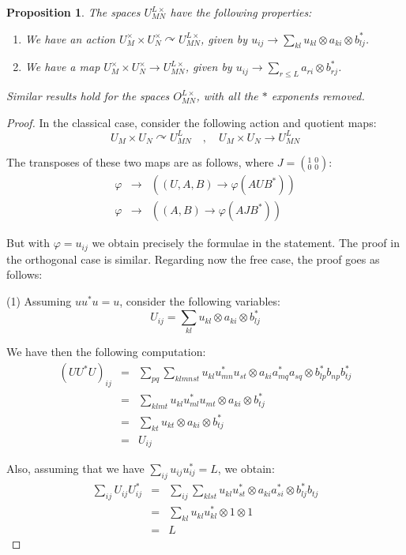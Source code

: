 \documentclass[12pt]{amsbook}
\newtheorem{proposition}[theorem]{Proposition}
\begin{document}
\begin{proposition}
The spaces $U_{MN}^{L\times}$ have the following properties:
\begin{enumerate}
\item We have an action $U_M^\times\times U_N^\times\curvearrowright U_{MN}^{L\times}$, given by $u_{ij}\to\sum_{kl}u_{kl}\otimes a_{ki}\otimes b_{lj}^*$.

\item We have a map $U_M^\times\times U_N^\times\to U_{MN}^{L\times}$, given by $u_{ij}\to\sum_{r\leq L}a_{ri}\otimes b_{rj}^*$.
\end{enumerate}
Similar results hold for the spaces $O_{MN}^{L\times}$, with all the $*$ exponents removed.
\end{proposition}

\begin{proof}
In the classical case, consider the following action and quotient maps:
$$U_M\times U_N\curvearrowright U_{MN}^L\quad,\quad 
U_M\times U_N\to U_{MN}^L$$

The transposes of these two maps are as follows, where $J=(^1_0{\ }^0_0)$:
\begin{eqnarray*}
\varphi&\to&((U,A,B)\to\varphi(AUB^*))\\
\varphi&\to&((A,B)\to\varphi(AJB^*))
\end{eqnarray*}

But with $\varphi=u_{ij}$ we obtain precisely the formulae in the statement. The proof in the orthogonal case is similar. Regarding now the free case, the proof goes as follows:

\medskip

(1) Assuming $uu^*u=u$, consider the following variables:
$$U_{ij}=\sum_{kl}u_{kl}\otimes a_{ki}\otimes b_{lj}^*$$

We have then the following computation:
\begin{eqnarray*}
(UU^*U)_{ij}
&=&\sum_{pq}\sum_{klmnst}u_{kl}u_{mn}^*u_{st}\otimes a_{ki}a_{mq}^*a_{sq}\otimes b_{lp}^*b_{np}b_{tj}^*\\
&=&\sum_{klmt}u_{kl}u_{ml}^*u_{mt}\otimes a_{ki}\otimes b_{tj}^*\\
&=&\sum_{kt}u_{kt}\otimes a_{ki}\otimes b_{tj}^*\\
&=&U_{ij}
\end{eqnarray*}

Also, assuming that we have $\sum_{ij}u_{ij}u_{ij}^*=L$, we obtain:
\begin{eqnarray*}
\sum_{ij}U_{ij}U_{ij}^*
&=&\sum_{ij}\sum_{klst}u_{kl}u_{st}^*\otimes a_{ki}a_{si}^*\otimes b_{lj}^*b_{tj}\\
&=&\sum_{kl}u_{kl}u_{kl}^*\otimes1\otimes1\\
&=&L
\end{eqnarray*}


\end{proof}
\end{document}

